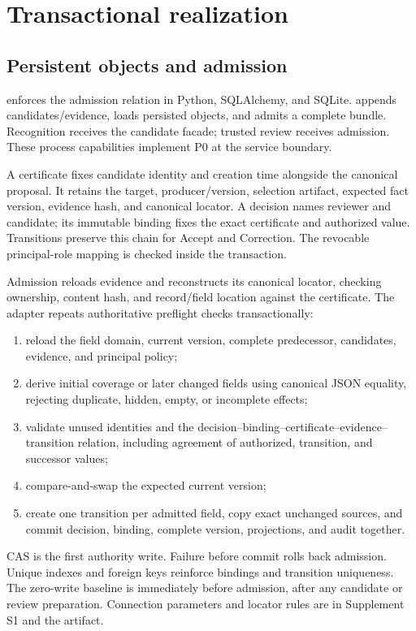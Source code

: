 \section{Transactional realization}
\label{sec:realization}

\subsection{Persistent objects and admission}

\system{} enforces the admission relation in Python, SQLAlchemy, and SQLite.  appends candidates/evidence,  loads persisted objects, and  admits a complete bundle. Recognition receives the candidate facade; trusted review receives admission. These process capabilities implement P0 at the service boundary.

A certificate fixes candidate identity and creation time alongside the canonical proposal. It retains the target, producer/version, selection artifact, expected fact version, evidence hash, and canonical locator. A decision names reviewer and candidate; its immutable binding fixes the exact certificate and authorized value. Transitions preserve this chain for Accept and Correction. The revocable principal-role mapping is checked inside the transaction.

Admission reloads evidence and reconstructs its canonical locator, checking ownership, content hash, and record/field location against the certificate. The adapter repeats authoritative preflight checks transactionally:
\begin{enumerate}[leftmargin=*]
\item reload the field domain, current version, complete predecessor, candidates, evidence, and principal policy;
\item derive initial coverage or later changed fields using canonical JSON equality, rejecting duplicate, hidden, empty, or incomplete effects;
\item validate unused identities and the decision--binding--certificate--evidence--transition relation, including agreement of authorized, transition, and successor values;
\item compare-and-swap the expected current version;
\item create one transition per admitted field, copy exact unchanged sources, and commit decision, binding, complete version, projections, and audit together.
\end{enumerate}
CAS is the first authority write. Failure before commit rolls back admission. Unique indexes and foreign keys reinforce bindings and transition uniqueness. The zero-write baseline is immediately before admission, after any candidate or review preparation. Connection parameters and locator rules are in Supplement S1 and the artifact.

